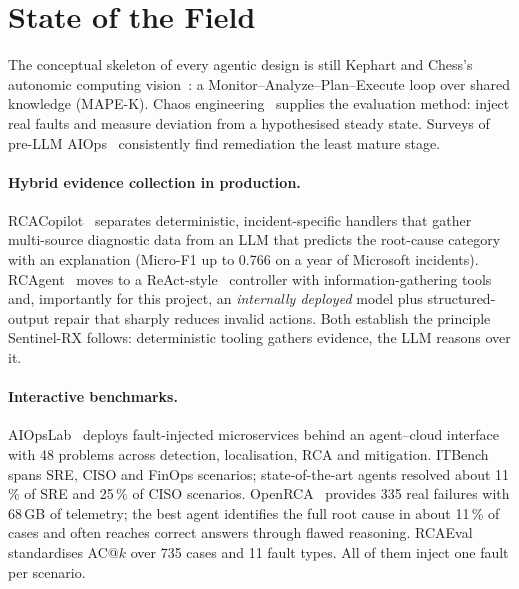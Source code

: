 \documentclass[11pt,a4paper]{article}
\newcommand{\pct}[1]{#1\,\%}
\begin{document}
\section{State of the Field}
\label{sec:sota}

The conceptual skeleton of every agentic design is still Kephart and Chess's autonomic computing
vision~\cite{kephart}: a Monitor--Analyze--Plan--Execute loop over shared knowledge (MAPE-K). Chaos
engineering~\cite{chaos} supplies the evaluation method: inject real faults and measure deviation
from a hypothesised steady state. Surveys of pre-LLM AIOps~\cite{notaro} consistently find
remediation the least mature stage.

\paragraph{Hybrid evidence collection in production.} RCACopilot~\cite{rcacopilot} separates
deterministic, incident-specific handlers that gather multi-source diagnostic data from an LLM that
predicts the root-cause category with an explanation (Micro-F1 up to 0.766 on a year of Microsoft
incidents). RCAgent~\cite{rcagent} moves to a ReAct-style~\cite{react} controller with
information-gathering tools and, importantly for this project, an \emph{internally deployed} model
plus structured-output repair that sharply reduces invalid actions. Both establish the principle
Sentinel-RX follows: deterministic tooling gathers evidence, the LLM reasons over it.

\paragraph{Interactive benchmarks.} AIOpsLab~\cite{aiopslab,aiopslab-vision} deploys fault-injected
microservices behind an agent--cloud interface with 48 problems across detection, localisation, RCA
and mitigation. ITBench~\cite{itbench} spans SRE, CISO and FinOps scenarios; state-of-the-art agents
resolved about \pct{11} of SRE and \pct{25} of CISO scenarios. OpenRCA~\cite{openrca} provides 335
real failures with 68\,GB of telemetry; the best agent identifies the full root cause in about
\pct{11} of cases and often reaches correct answers through flawed reasoning. RCAEval~\cite{rcaeval}
standardises AC@$k$ over 735 cases and 11 fault types. All of them inject one fault per scenario.
\end{document}
